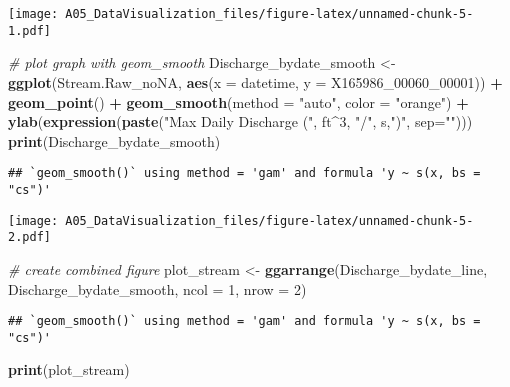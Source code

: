 \documentclass[]{article}
\newenvironment{Shaded}{\begin{snugshade}}{\end{snugshade}}
\newcommand{\KeywordTok}[1]{\textcolor[rgb]{0.13,0.29,0.53}{\textbf{#1}}}
\newcommand{\DataTypeTok}[1]{\textcolor[rgb]{0.13,0.29,0.53}{#1}}
\newcommand{\DecValTok}[1]{\textcolor[rgb]{0.00,0.00,0.81}{#1}}
\newcommand{\StringTok}[1]{\textcolor[rgb]{0.31,0.60,0.02}{#1}}
\newcommand{\CommentTok}[1]{\textcolor[rgb]{0.56,0.35,0.01}{\textit{#1}}}
\newcommand{\OperatorTok}[1]{\textcolor[rgb]{0.81,0.36,0.00}{\textbf{#1}}}
\newcommand{\NormalTok}[1]{#1}
\begin{document}
\texttt{[image: A05\_DataVisualization\_files/figure-latex/unnamed-chunk-5-1.pdf]}

\begin{Shaded}
\begin{Highlighting}[]
\CommentTok{# plot graph with geom_smooth}
\NormalTok{Discharge_bydate_smooth <-}\StringTok{ }\KeywordTok{ggplot}\NormalTok{(Stream.Raw_noNA, }\KeywordTok{aes}\NormalTok{(}\DataTypeTok{x =}\NormalTok{ datetime, }\DataTypeTok{y =}\NormalTok{ X165986_00060_}\DecValTok{00001}\NormalTok{)) }\OperatorTok{+}
\StringTok{  }\KeywordTok{geom_point}\NormalTok{() }\OperatorTok{+}
\StringTok{  }\KeywordTok{geom_smooth}\NormalTok{(}\DataTypeTok{method =} \StringTok{"auto"}\NormalTok{, }\DataTypeTok{color =} \StringTok{"orange"}\NormalTok{) }\OperatorTok{+}
\StringTok{  }\KeywordTok{ylab}\NormalTok{(}\KeywordTok{expression}\NormalTok{(}\KeywordTok{paste}\NormalTok{(}\StringTok{"Max Daily Discharge ("}\NormalTok{, ft}\OperatorTok{^}\DecValTok{3}\NormalTok{, }\StringTok{"/"}\NormalTok{, s,}\StringTok{")"}\NormalTok{, }\DataTypeTok{sep=}\StringTok{""}\NormalTok{)))}
\KeywordTok{print}\NormalTok{(Discharge_bydate_smooth)}
\end{Highlighting}
\end{Shaded}

\begin{verbatim}
## `geom_smooth()` using method = 'gam' and formula 'y ~ s(x, bs = "cs")'
\end{verbatim}

\texttt{[image: A05\_DataVisualization\_files/figure-latex/unnamed-chunk-5-2.pdf]}

\begin{Shaded}
\begin{Highlighting}[]
\CommentTok{# create combined figure}
\NormalTok{plot_stream <-}\StringTok{ }\KeywordTok{ggarrange}\NormalTok{(Discharge_bydate_line, Discharge_bydate_smooth,}
                         \DataTypeTok{ncol =} \DecValTok{1}\NormalTok{, }\DataTypeTok{nrow =} \DecValTok{2}\NormalTok{)}
\end{Highlighting}
\end{Shaded}

\begin{verbatim}
## `geom_smooth()` using method = 'gam' and formula 'y ~ s(x, bs = "cs")'
\end{verbatim}

\begin{Shaded}
\begin{Highlighting}[]
\KeywordTok{print}\NormalTok{(plot_stream)}
\end{Highlighting}
\end{Shaded}
\end{document}
